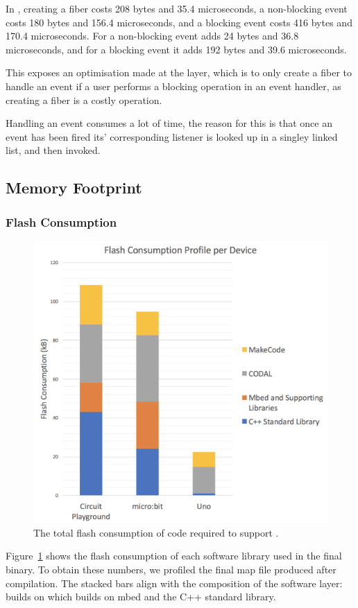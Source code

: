 In \CO, creating a fiber costs 208 bytes and 35.4 microseconds, a non-blocking event costs 180 bytes and 156.4 microseconds, and a blocking event costs 416 bytes and 170.4 microseconds. For a non-blocking event \MC adds 24 bytes and 36.8 microseconds, and for a blocking event it adds 192 bytes and 39.6 microseconds.

This exposes an optimisation made at the \CO layer, which is to only create a fiber to handle an event if a user performs a blocking operation in an event handler, as creating a fiber is a costly operation.

Handling an event consumes a lot of time, the reason for this is that once an event has been fired its' corresponding listener is looked up in a singley linked list, and then invoked.

\subsection{Memory Footprint}

\subsubsection{Flash Consumption}

\begin{figure}[ht]
    \includegraphics[width=.75\columnwidth]{./images/flash-consumption-per-device.png}
\caption{\label{fig:flash-consumption}The total flash consumption of code required to support \MC.}
\end{figure}

Figure~\ref{fig:flash-consumption} shows the flash consumption of each software library used in the final \MC binary. To obtain these numbers, we profiled the final map file produced after compilation. The stacked bars align with the composition of the software layer: \MC builds on \CO which builds on mbed and the C++ standard library.

